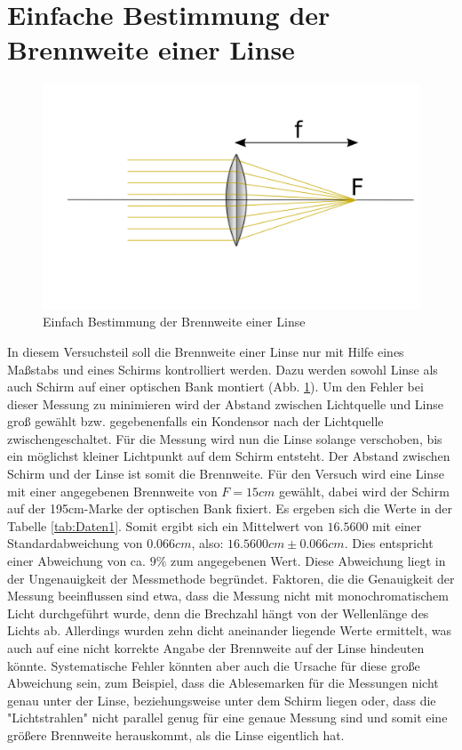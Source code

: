 \section{Einfache Bestimmung der Brennweite einer Linse}

\begin{figure}[ht]
    \centering
    \includegraphics[scale=0.8]{Geometrische_Optik/Protokoll/fig/Versuch1.1.png}
    \caption{Einfach Bestimmung der Brennweite einer Linse}
    \label{fig:Versuch1.1}
\end{figure}

In diesem Versuchsteil soll die Brennweite einer Linse nur mit Hilfe eines Maßstabs und eines Schirms kontrolliert werden. Dazu werden sowohl Linse als auch Schirm auf einer optischen Bank montiert (Abb. \ref{fig:Versuch1.1}). Um den Fehler bei dieser Messung zu minimieren wird der Abstand zwischen Lichtquelle und Linse groß gewählt bzw. gegebenenfalls ein Kondensor nach der Lichtquelle zwischengeschaltet. Für die Messung wird nun die Linse solange verschoben, bis ein möglichst kleiner Lichtpunkt auf dem Schirm entsteht. Der Abstand zwischen Schirm und der Linse ist somit die Brennweite. Für den Versuch wird eine Linse mit einer angegebenen Brennweite von $F = 15 cm$ gewählt, dabei wird der Schirm auf der 195cm-Marke der optischen Bank fixiert. Es ergeben sich die Werte in der Tabelle \ref{tab:Daten1}. Somit ergibt sich ein Mittelwert von $16.5600$ mit einer Standardabweichung von $0.066cm$, also: $16.5600cm \pm 0.066cm$. Dies entspricht einer Abweichung von ca. $9 \% $ zum angegebenen Wert. Diese Abweichung liegt in der Ungenauigkeit der Messmethode begründet. Faktoren, die die Genauigkeit der Messung beeinflussen sind etwa, dass die Messung nicht mit monochromatischem Licht durchgeführt wurde, denn die Brechzahl hängt von der Wellenlänge des Lichts ab. Allerdings wurden zehn dicht aneinander liegende Werte ermittelt, was auch auf eine nicht korrekte Angabe der Brennweite auf der Linse hindeuten könnte. Systematische Fehler könnten aber auch die Ursache für diese große Abweichung sein, zum Beispiel, dass die Ablesemarken für die Messungen nicht genau unter der Linse, beziehungsweise unter dem Schirm liegen oder, dass die "Lichtstrahlen" nicht parallel genug für eine genaue Messung sind und somit eine größere Brennweite herauskommt, als die Linse eigentlich hat.
 
